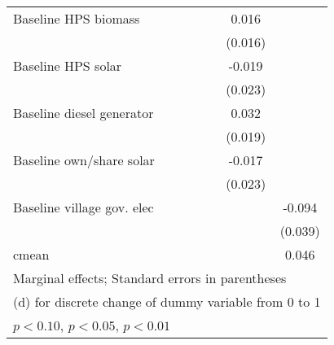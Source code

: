 \begin{table}[htbp]
\begin{tabular*}{1\hsize}{@{\hskip\tabcolsep\extracolsep\fill}l*{6}{c}}
Baseline HPS biomass&                  &                  &                  &                  &    0.016         &                  \\
                &                  &                  &                  &                  &  (0.016)         &                  \\
Baseline HPS solar&                  &                  &                  &                  &   -0.019         &                  \\
                &                  &                  &                  &                  &  (0.023)         &                  \\
Baseline diesel generator&                  &                  &                  &                  &    0.032\sym{*}  &                  \\
                &                  &                  &                  &                  &  (0.019)         &                  \\
Baseline own/share solar&                  &                  &                  &                  &   -0.017         &                  \\
                &                  &                  &                  &                  &  (0.023)         &                  \\
Baseline village gov. elec&                  &                  &                  &                  &                  &   -0.094\sym{**} \\
                &                  &                  &                  &                  &                  &  (0.039)         \\
\midrule
cmean           &                  &                  &                  &                  &                  &    0.046         \\
\bottomrule
\multicolumn{7}{l}{\footnotesize Marginal effects; Standard errors in parentheses}\\
\multicolumn{7}{l}{\footnotesize  (d) for discrete change of dummy variable from 0 to 1}\\
\multicolumn{7}{l}{\footnotesize \sym{*} \(p<0.10\), \sym{**} \(p<0.05\), \sym{***} \(p<0.01\)}\\
\end{tabular*}
\end{table}
